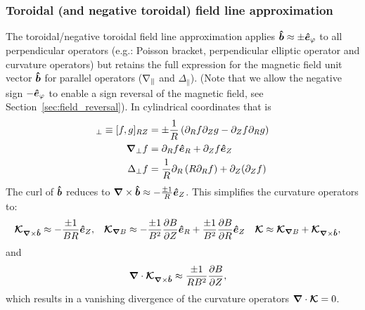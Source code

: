 \subsubsection{Toroidal (and negative toroidal) field line approximation}\label{sec:torfieldlineapprox}
The toroidal/negative toroidal field line approximation applies \(\bm{\hat{b}}\approx \pm \bm{\hat{e}}_\varphi\) to all perpendicular operators
(e.g.: Poisson bracket, perpendicular elliptic operator and curvature operators)
but retains the full expression for the magnetic field unit vector \(\bm{\hat{b}}\)
for parallel operators (\(\nabla_\parallel\) and \(\Delta_\parallel\)).
(Note that we allow the negative sign $-\bm{\hat{e}}_\varphi$ to enable a sign reversal of the magnetic field, see Section~\ref{sec:field_reversal}).
In cylindrical coordinates that is
\begin{align}
[f,g]_\perp \equiv [f,g]_{RZ} &= \pm\frac{1}{R} \left(\partial_R f\partial_Z g - \partial_Z f\partial_R g\right) \\
\np f &= \partial_R f \ehat_R + \partial_Z f \ehat_Z \\
\Delta_\perp f &= \frac{1}{R}\partial_R \left( R \partial_R f\right) + \partial_Z(\partial_Z f)
\label{}
\end{align}
The curl of $\bm{\hat{b}}$ reduces to
 ${\boldsymbol{\nabla}}\times\bm{\hat{b}} \approx -  \frac{\pm 1}{R} \bm{\hat{e}}_Z$.
This simplifies the curvature operators to:
\begin{align}
{\boldsymbol{\mathcal{K}}}_{{{\boldsymbol{\nabla}}\times\bm{\hat{b}}}}  &\approx  -  \frac{\pm 1}{B R} \bm{\hat{e}}_Z , &
{\boldsymbol{ \mathcal{K} }}_{{\boldsymbol{\nabla}}  B}  &\approx  -\frac{\pm 1}{B^2}\frac{\partial B}{\partial Z}\bm{\hat{e}}_R +\frac{\pm 1}{B^2} \frac{\partial B}{\partial R}\bm{\hat{e}}_Z &
{\boldsymbol{ \mathcal{K} }} &\approx {\boldsymbol{ \mathcal{K} }}_{{\boldsymbol{\nabla}}  B}  +{\boldsymbol{ \mathcal{K} }}_{{{\boldsymbol{\nabla}}\times\bm{\hat{b}}}} ,
\end{align}
and
\begin{align}
 {\boldsymbol{\nabla}}\cdot {\boldsymbol{\mathcal{K}}}_{{{\boldsymbol{\nabla}}\times\bm{\hat{b}}}} &\approx \frac{\pm 1}{R B^2} \frac{\partial B}{\partial Z},
\end{align}
which results in a vanishing divergence of the curvature operators \( {\boldsymbol{\nabla}}\cdot {\boldsymbol{ \mathcal{K} }} = 0\).

